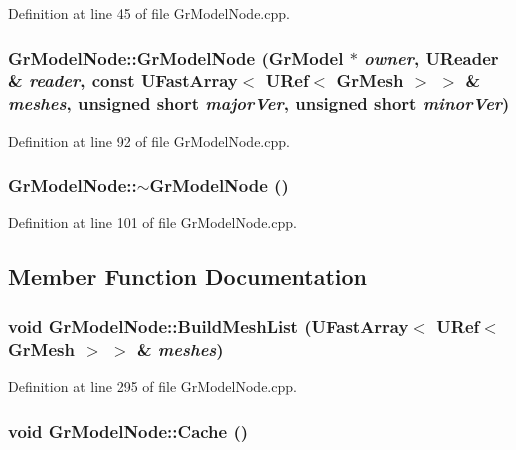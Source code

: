 Definition at line 45 of file GrModelNode.cpp.\hypertarget{class_gr_model_node_391064a9dadfae2e8e0022a1f7009602}{
\subsubsection[{GrModelNode}]{\setlength{\rightskip}{0pt plus 5cm}GrModelNode::GrModelNode ({\bf GrModel} $\ast$ {\em owner}, \/  {\bf UReader} \& {\em reader}, \/  const {\bf UFastArray}$<$ {\bf URef}$<$ {\bf GrMesh} $>$ $>$ \& {\em meshes}, \/  unsigned short {\em majorVer}, \/  unsigned short {\em minorVer})}}
\label{class_gr_model_node_391064a9dadfae2e8e0022a1f7009602}




Definition at line 92 of file GrModelNode.cpp.\hypertarget{class_gr_model_node_2dfd62bcdf39b2c3004c762d865ffb0d}{
\subsubsection[{$\sim$GrModelNode}]{\setlength{\rightskip}{0pt plus 5cm}GrModelNode::$\sim$GrModelNode ()}}
\label{class_gr_model_node_2dfd62bcdf39b2c3004c762d865ffb0d}




Definition at line 101 of file GrModelNode.cpp.

\subsection{Member Function Documentation}
\hypertarget{class_gr_model_node_2c131ad23d4aa9b499340a803690e3d0}{
\subsubsection[{BuildMeshList}]{\setlength{\rightskip}{0pt plus 5cm}void GrModelNode::BuildMeshList ({\bf UFastArray}$<$ {\bf URef}$<$ {\bf GrMesh} $>$ $>$ \& {\em meshes})}}
\label{class_gr_model_node_2c131ad23d4aa9b499340a803690e3d0}




Definition at line 295 of file GrModelNode.cpp.\hypertarget{class_gr_model_node_8dfebc45736fa221d3988d7bc05f71bf}{
\subsubsection[{Cache}]{\setlength{\rightskip}{0pt plus 5cm}void GrModelNode::Cache ()}}
\label{class_gr_model_node_8dfebc45736fa221d3988d7bc05f71bf}




